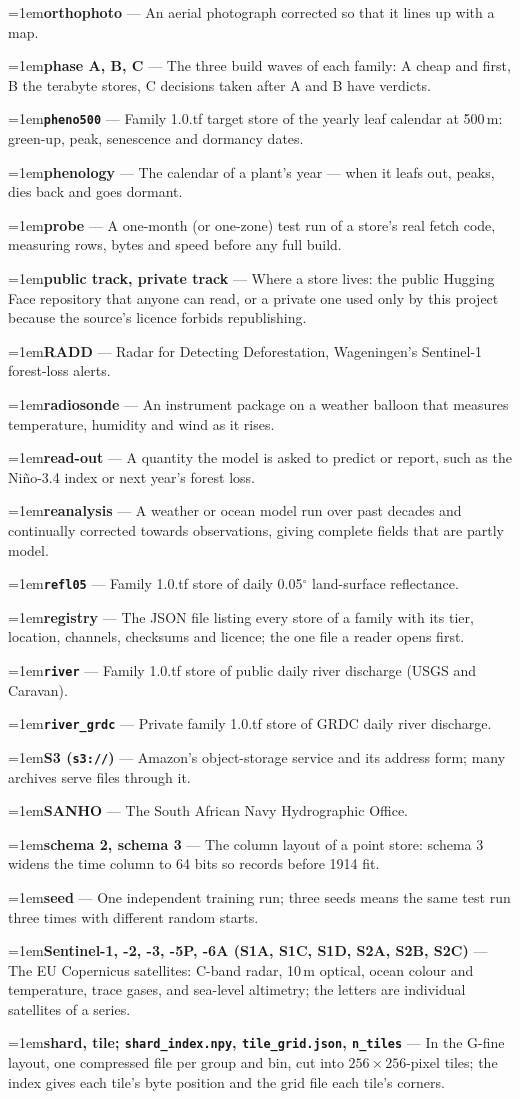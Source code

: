 \documentclass[10pt]{article}
\newcommand{\code}[1]{\texttt{#1}}
\newcommand{\gl}[2]{\par\hangindent=1em\hangafter=1\textbf{#1} --- #2\par}
\begin{document}
\gl{orthophoto}{An aerial photograph corrected so that it lines up with a map.}
\gl{phase A, B, C}{The three build waves of each family: A cheap and first, B the terabyte stores, C decisions taken after A and B have verdicts.}
\gl{\code{pheno500}}{Family 1.0.tf target store of the yearly leaf calendar at 500\,m: green-up, peak, senescence and dormancy dates.}
\gl{phenology}{The calendar of a plant's year --- when it leafs out, peaks, dies back and goes dormant.}
\gl{probe}{A one-month (or one-zone) test run of a store's real fetch code, measuring rows, bytes and speed before any full build.}
\gl{public track, private track}{Where a store lives: the public Hugging Face repository that anyone can read, or a private one used only by this project because the source's licence forbids republishing.}
\gl{RADD}{Radar for Detecting Deforestation, Wageningen's Sentinel-1 forest-loss alerts.}
\gl{radiosonde}{An instrument package on a weather balloon that measures temperature, humidity and wind as it rises.}
\gl{read-out}{A quantity the model is asked to predict or report, such as the Ni\~no-3.4 index or next year's forest loss.}
\gl{reanalysis}{A weather or ocean model run over past decades and continually corrected towards observations, giving complete fields that are partly model.}
\gl{\code{refl05}}{Family 1.0.tf store of daily 0.05$^\circ$ land-surface reflectance.}
\gl{registry}{The JSON file listing every store of a family with its tier, location, channels, checksums and licence; the one file a reader opens first.}
\gl{\code{river}}{Family 1.0.tf store of public daily river discharge (USGS and Caravan).}
\gl{\code{river\_grdc}}{Private family 1.0.tf store of GRDC daily river discharge.}
\gl{S3 (\code{s3://})}{Amazon's object-storage service and its address form; many archives serve files through it.}
\gl{SANHO}{The South African Navy Hydrographic Office.}
\gl{schema 2, schema 3}{The column layout of a point store: schema 3 widens the time column to 64 bits so records before 1914 fit.}
\gl{seed}{One independent training run; three seeds means the same test run three times with different random starts.}
\gl{Sentinel-1, -2, -3, -5P, -6A (S1A, S1C, S1D, S2A, S2B, S2C)}{The EU Copernicus satellites: C-band radar, 10\,m optical, ocean colour and temperature, trace gases, and sea-level altimetry; the letters are individual satellites of a series.}
\gl{shard, tile; \code{shard\_index.npy}, \code{tile\_grid.json}, \code{n\_tiles}}{In the G-fine layout, one compressed file per group and bin, cut into $256 \times 256$-pixel tiles; the index gives each tile's byte position and the grid file each tile's corners.}
\end{document}
